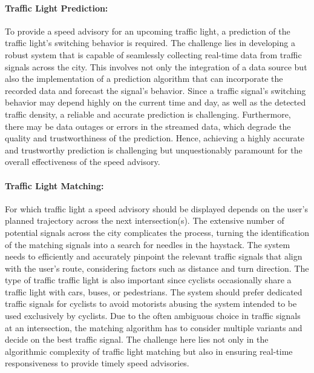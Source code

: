 \paragraph{Traffic Light Prediction:} To provide a speed advisory for an upcoming traffic light, a prediction of the traffic light's switching behavior is required. The challenge lies in developing a robust system that is capable of seamlessly collecting real-time data from traffic signals across the city. This involves not only the integration of a data source but also the implementation of a prediction algorithm that can incorporate the recorded data and forecast the signal's behavior. Since a traffic signal's switching behavior may depend highly on the current time and day, as well as the detected traffic density, a reliable and accurate prediction is challenging. Furthermore, there may be data outages or errors in the streamed data, which degrade the quality and trustworthiness of the prediction. Hence, achieving a highly accurate and trustworthy prediction is challenging but unquestionably paramount for the overall effectiveness of the speed advisory.

\paragraph{Traffic Light Matching:} For which traffic light a speed advisory should be displayed depends on the user's planned trajectory across the next intersection(s). The extensive number of potential signals across the city complicates the process, turning the identification of the matching signals into a search for needles in the haystack. The system needs to efficiently and accurately pinpoint the relevant traffic signals that align with the user's route, considering factors such as distance and turn direction. The type of traffic traffic light is also important since cyclists occasionally share a traffic light with cars, buses, or pedestrians. The system should prefer dedicated traffic signals for cyclists to avoid motorists abusing the system intended to be used exclusively by cyclists. Due to the often ambiguous choice in traffic signals at an intersection, the matching algorithm has to consider multiple variants and decide on the best traffic signal. The challenge here lies not only in the algorithmic complexity of traffic light matching but also in ensuring real-time responsiveness to provide timely speed advisories.

